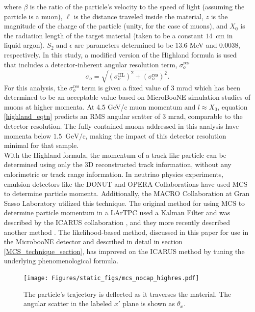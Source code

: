 \documentclass[a4paper,11pt]{article}
\begin{document}
\noindent where $\beta$ is the ratio of the particle's velocity to the speed of light (assuming the particle is a muon), $\ell$ is the distance traveled inside the material, $z$ is the magnitude of the charge of the particle (unity, for the case of muons), and $X_0$ is the radiation length of the target material (taken to be a constant $14$~cm in liquid argon). $S_2$ and $\epsilon$ are parameters determined to be 13.6 MeV and 0.0038, respectively. In this study, a modified version of the Highland formula is used that includes a detector-inherent angular resolution term, $\sigma_o^{\text{res}}$
\begin{equation}\label{modified_highland_eqtn}
\sigma_{o} = \sqrt{ (\sigma_o^{\text{HL}})^2 + (\sigma_o^{\text{res}})^2}.%
\end{equation}
For this analysis, the $\sigma_o^{\text{res}}$ term is given a fixed value of 3 mrad which has been determined to be an acceptable value based on MicroBooNE simulation studies of muons at higher momenta. At 4.5 GeV/c muon momentum and $l\approx X_0$, equation \ref{highland_eqtn} predicts an RMS angular scatter of 3 mrad, comparable to the detector resolution. The fully contained muons addressed in this analysis have momenta below $1.5$~$\text{GeV/c}$, making the impact of this detector resolution minimal for that sample.\\

With the Highland formula, the momentum of a track-like particle can be determined using only the 3D reconstructed track information, without any calorimetric or track range information. In neutrino physics experiments, emulsion detectors like the DONUT \cite{DONUT_paper} and OPERA \cite{OPERA_paper} Collaborations have used MCS to determine particle momenta. Additionally, the MACRO \cite{MACRO_paper} Collaboration at Gran Sasso Laboratory utilized this technique. The original method for using MCS to determine particle momentum in a LArTPC used a Kalman Filter and was described by the ICARUS collaboration \cite{icarus_mcs_paper}, and they more recently described another method \cite{new_icarus_paper}. The likelihood-based method, discussed in this paper for use in the MicrobooNE detector and described in detail in section \ref{MCS_technique_section}, has improved on the ICARUS method by tuning the underlying phenomenological formula.


\begin{figure}[ht!]
\centering
	\texttt{[image: Figures/static\_figs/mcs\_nocap\_highres.pdf]} \\
\caption{The particle's trajectory is deflected as it traverses the material. The angular scatter in the labeled $x'$ plane is shown as $\theta_x$.}\label{mcs_nocap_fig}
\end{figure}
\end{document}
